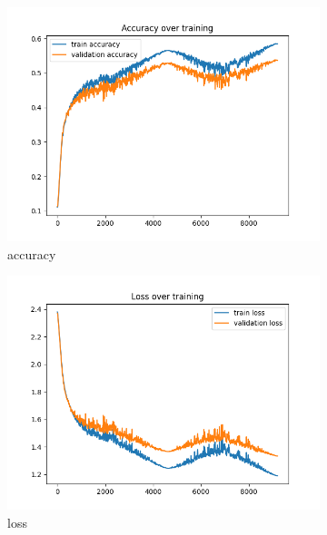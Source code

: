 \documentclass[a4paper]{article}
\begin{document}
\begin{figure}[h]
	\centering
	\begin{subfigure}{0.3\textwidth}
		\centering
		\includegraphics[width=\linewidth]{images/ex2_no_batch_acc.png}
		\caption{accuracy}
	\end{subfigure}
	\begin{subfigure}{0.3\textwidth}
		\centering
		\includegraphics[width=\linewidth]{images/ex2_no_batch_loss.png}
		\caption{loss}
	\end{subfigure}
	\begin{subfigure}{0.3\textwidth}
		\centering

\end{subfigure}
\end{figure}
\end{document}
